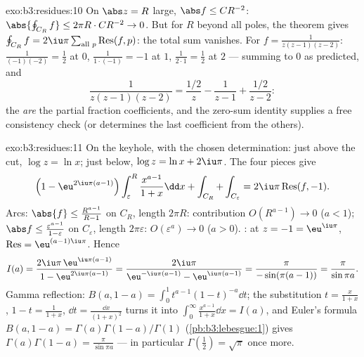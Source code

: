 \begin{solution}{exo:b3:residues:10}
On $\abs z = R$ large, $\abs f \leq C R^{-2}$: $\abs{\oint_{C_R}
f} \leq 2\pi R\cdot CR^{-2} \to 0$. But for $R$ beyond all
poles, the  theorem gives $\oint_{C_R}f =
2\iu\pi\sum_{\text{all }p}\operatorname{Res}(f, p)$: the total
sum vanishes. For $f = \frac1{z(z-1)(z-2)}$: 
$\frac1{(-1)(-2)} = \frac12$ at $0$, $\frac1{1\cdot(-1)} = -1$
at $1$, $\frac1{2\cdot1} = \frac12$ at $2$ --- summing to $0$
as predicted, and
\[
\frac1{z(z-1)(z-2)} = \frac{1/2}{z} - \frac1{z - 1} +
\frac{1/2}{z-2} :
\]
the  \emph{are} the partial fraction coefficients, and
the zero-sum identity supplies a free consistency check (or
determines the last coefficient from the others).
\end{solution}

\begin{solution}{exo:b3:residues:11}
On the keyhole, with the chosen determination:
just above the cut, $\log z = \ln x$; just below, $\log z =
\ln x + 2\iu\pi$. The four pieces give
\[
\Bigl(1 - \eu^{2\iu\pi(a-1)}\Bigr)\int_\varepsilon^R
\frac{x^{a-1}}{1+x}\dd x + \int_{C_R} + \int_{C_\varepsilon}
= 2\iu\pi\operatorname{Res}(f, -1) .
\]
Arcs: $\abs{f} \leq \frac{R^{a-1}}{R - 1}$ on $C_R$, length
$2\pi R$: contribution $O(R^{a-1}) \to 0$ ($a < 1$);
$\abs f \leq \frac{\varepsilon^{a-1}}{1 - \varepsilon}$ on
$C_\varepsilon$, length $2\pi\varepsilon$: $O(\varepsilon^a)
\to 0$ ($a > 0$). : at $z = -1 = \eu^{\iu\pi}$,
$\operatorname{Res} = \eu^{(a-1)\iu\pi}$. Hence
\[
I(a) = \frac{2\iu\pi\,\eu^{\iu\pi(a-1)}}{1 -
\eu^{2\iu\pi(a-1)}}
= \frac{2\iu\pi}{\eu^{-\iu\pi(a-1)} - \eu^{\iu\pi(a-1)}}
= \frac{\pi}{-\sin(\pi(a-1))} = \frac{\pi}{\sin\pi a} .
\]
Gamma reflection: $B(a, 1-a) =
\int_0^1t^{a-1}(1-t)^{-a}\dd t$; the substitution $t =
\frac x{1+x}$, $1 - t = \frac1{1+x}$, $\dd t =
\frac{\dd x}{(1+x)^2}$ turns it into $\int_0^\infty
\frac{x^{a-1}}{1+x}\dd x = I(a)$, and Euler's formula
$B(a, 1-a) = \Gamma(a)\Gamma(1-a)/\Gamma(1) $
(\cref{pb:b3:lebesgue:1}) gives
$\Gamma(a)\Gamma(1-a) = \frac\pi{\sin\pi a}$ --- in
particular $\Gamma(\tfrac12) = \sqrt\pi$ once more.

\end{solution}

